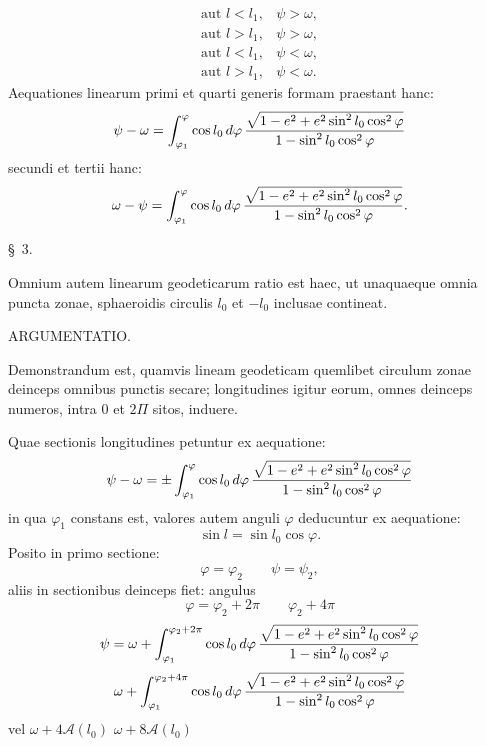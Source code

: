 \begingroup\small
\[
\begin{array}{ll}
\text{aut } l<l_1, & \psi>\omega,\\
\text{aut } l>l_1, & \psi>\omega,\\
\text{aut } l<l_1, & \psi<\omega,\\
\text{aut } l>l_1, & \psi<\omega.
\end{array}
\]
Aequationes linearum primi et quarti generis formam praestant hanc:
\[
 \psi-\omega=\int_{\varphi_1}^{\varphi}\cos l_0\,d\varphi\,{\sqrt{1-e^2+e^2\sin^2l_0\cos^2\varphi}\over 1-\sin^2l_0\cos^2\varphi}
\]
secundi et tertii hanc:
\[
 \omega-\psi=\int_{\varphi_1}^{\varphi}\cos l_0\,d\varphi\,{\sqrt{1-e^2+e^2\sin^2l_0\cos^2\varphi}\over 1-\sin^2l_0\cos^2\varphi}.
\]

\begin{center}\S\ 3.\end{center}

Omnium autem linearum geodeticarum ratio est haec, ut unaquaeque omnia puncta zonae, sphaeroidis circulis $l_0$ et $-l_0$ inclusae contineat.

\begin{center}ARGUMENTATIO.\end{center}

Demonstrandum est, quamvis lineam geodeticam quemlibet circulum zonae deinceps omnibus punctis secare; longitudines igitur eorum, omnes deinceps numeros, intra $0$ et $2\Pi$ sitos, induere.

Quae sectionis longitudines petuntur ex aequatione:
\[
 \psi-\omega=\pm\int_{\varphi_1}^{\varphi}\cos l_0\,d\varphi\,{\sqrt{1-e^2+e^2\sin^2l_0\cos^2\varphi}\over 1-\sin^2l_0\cos^2\varphi}
\]
in qua $\varphi_1$ constans est, valores autem anguli $\varphi$ deducuntur ex aequatione:
\[
 \sin l=\sin l_0\cos\varphi.
\]
Posito in primo sectione:
\[
 \varphi=\varphi_2\qquad \psi=\psi_2,
\]
aliis in sectionibus deinceps fiet: angulus
\[
 \varphi=\varphi_2+2\pi\qquad \varphi_2+4\pi
\]
\[
 \psi=\omega+\int_{\varphi_1}^{\varphi_2+2\pi}\cos l_0\,d\varphi\,{\sqrt{1-e^2+e^2\sin^2l_0\cos^2\varphi}\over 1-\sin^2l_0\cos^2\varphi}
\]
\[
 \omega+\int_{\varphi_1}^{\varphi_2+4\pi}\cos l_0\,d\varphi\,{\sqrt{1-e^2+e^2\sin^2l_0\cos^2\varphi}\over 1-\sin^2l_0\cos^2\varphi}
\]
vel $\omega+4\mathcal A(l_0)$ \qquad $\omega+8\mathcal A(l_0)$
\endgroup
